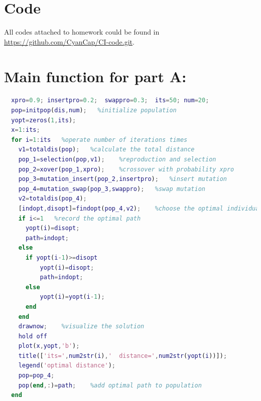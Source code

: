 \documentclass{article}
\begin{document}
\section*{Code}
All codes attached to homework could be found in \url{https://github.com/CyanCap/CI-code.git}.

\section*{Main function for part A:}
\begin{lstlisting}[language=matlab]
%probability for crossover and mutation. iterations and population size setting:
  xpro=0.9; insertpro=0.2;  swappro=0.3;  its=50; num=20;
  pop=initpop(dis,num);   %initialize population
  yopt=zeros(1,its);
  x=1:its;
  for i=1:its   %operate number of iterations times
    v1=totaldis(pop);   %calculate the total distance
    pop_1=selection(pop,v1);    %reproduction and selection
    pop_2=xover(pop_1,xpro);    %crossover with probability xpro
    pop_3=mutation_insert(pop_2,insertpro);   %insert mutation 
    pop_4=mutation_swap(pop_3,swappro);   %swap mutation
    v2=totaldis(pop_4);                       
    [indopt,disopt]=findopt(pop_4,v2);    %choose the optimal individuals
    if i<=1   %record the optimal path
      yopt(i)=disopt;
      path=indopt;
    else
      if yopt(i-1)>=disopt
          yopt(i)=disopt;
          path=indopt;
      else
          yopt(i)=yopt(i-1);
      end
    end
    drawnow;    %visualize the solution
    hold off
    plot(x,yopt,'b');
    title(['its=',num2str(i),'  distance=',num2str(yopt(i))]);
    legend('optimal distance');
    pop=pop_4;
    pop(end,:)=path;    %add optimal path to population
  end
\end{lstlisting}
\end{document}
